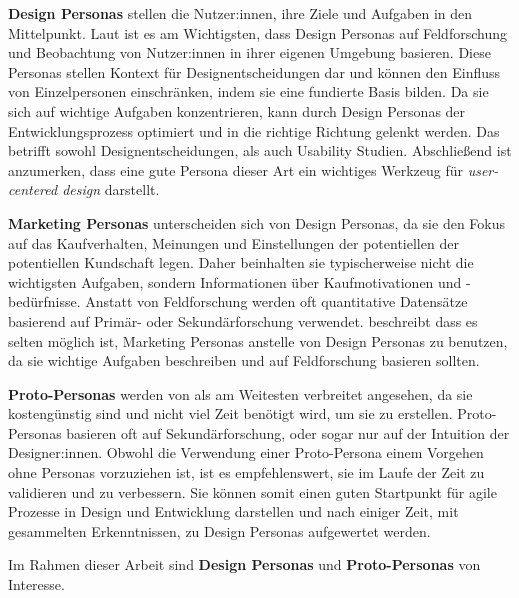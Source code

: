 \textbf{Design Personas} stellen die Nutzer:innen, ihre Ziele und Aufgaben in den Mittelpunkt. Laut
\textcite{tomlinUXOptimization2018} ist es am Wichtigsten, dass Design Personas auf Feldforschung
und Beobachtung von Nutzer:innen in ihrer eigenen Umgebung basieren. Diese Personas stellen Kontext
für Designentscheidungen dar und können den Einfluss von Einzelpersonen einschränken, indem sie eine
fundierte Basis bilden.  Da sie sich auf wichtige Aufgaben konzentrieren, kann
durch Design Personas der Entwicklungsprozess optimiert und in die richtige Richtung gelenkt werden.
Das betrifft sowohl Designentscheidungen, als auch Usability Studien. Abschließend ist anzumerken,
dass eine gute Persona dieser Art ein wichtiges Werkzeug für \textit{user-centered design}
darstellt.
\parencite{tomlinUXOptimization2018}

\textbf{Marketing Personas} unterscheiden sich von Design Personas, da sie den Fokus auf das
Kaufverhalten, Meinungen und Einstellungen der potentiellen der potentiellen Kundschaft legen. Daher
beinhalten sie typischerweise nicht die wichtigsten Aufgaben, sondern Informationen über
Kaufmotivationen und -bedürfnisse. Anstatt von Feldforschung werden oft quantitative Datensätze
basierend auf Primär- oder Sekundärforschung verwendet. \textcite{tomlinUXOptimization2018}
beschreibt dass es selten möglich ist, Marketing Personas anstelle von Design Personas zu benutzen,
da sie wichtige Aufgaben beschreiben und auf Feldforschung basieren sollten.
\parencite{tomlinUXOptimization2018}

\textbf{Proto-Personas} werden von \textcite{tomlinUXOptimization2018} als am Weitesten verbreitet
angesehen, da sie kostengünstig sind und nicht viel Zeit benötigt wird, um sie zu erstellen.
Proto-Personas basieren oft auf Sekundärforschung, oder sogar nur auf der Intuition der
Designer:innen. Obwohl die Verwendung einer Proto-Persona einem Vorgehen ohne Personas vorzuziehen
ist, ist es empfehlenswert, sie im Laufe der Zeit zu validieren und zu verbessern. Sie können somit
einen guten Startpunkt für agile Prozesse in Design und Entwicklung darstellen und nach einiger
Zeit, mit gesammelten Erkenntnissen, zu Design Personas aufgewertet werden.
\parencite{tomlinUXOptimization2018}

Im Rahmen dieser Arbeit sind \textbf{Design Personas} und \textbf{Proto-Personas} von Interesse.

